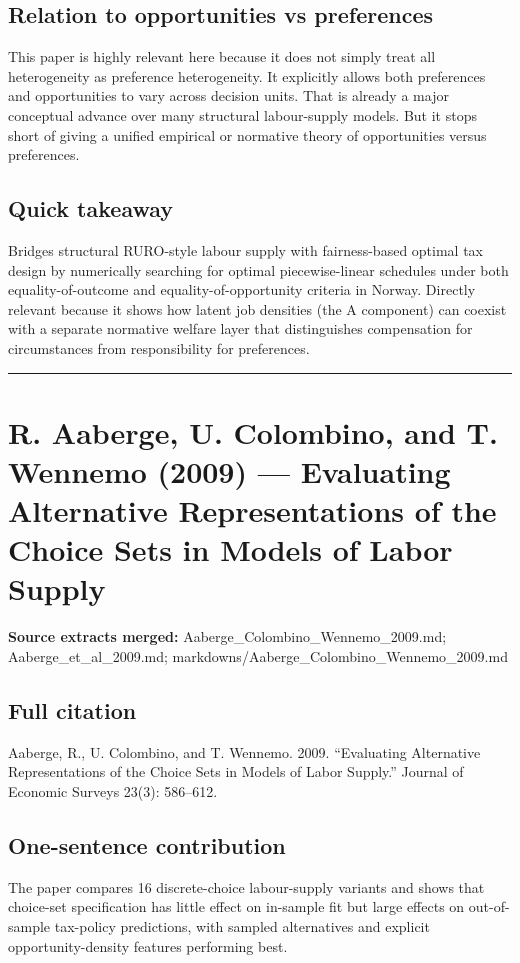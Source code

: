 \documentclass[11pt,a4paper]{article}
\begin{document}
\subsection*{Relation to opportunities vs preferences}
This paper is highly relevant here because it does not simply treat all heterogeneity as preference heterogeneity. It explicitly allows both preferences and opportunities to vary across decision units. That is already a major conceptual advance over many structural labour-supply models. But it stops short of giving a unified empirical or normative theory of opportunities versus preferences.

\subsection*{Quick takeaway}
Bridges structural RURO-style labour supply with fairness-based optimal tax design by numerically searching for optimal piecewise-linear schedules under both equality-of-outcome and equality-of-opportunity criteria in Norway. Directly relevant because it shows how latent job densities (the A component) can coexist with a separate normative welfare layer that distinguishes compensation for circumstances from responsibility for preferences.


\medskip\hrule\medskip

\section*{R. Aaberge, U. Colombino, and T. Wennemo (2009) — Evaluating Alternative Representations of the Choice Sets in Models of Labor Supply}

\textbf{Source extracts merged:} Aaberge\_Colombino\_Wennemo\_2009.md; Aaberge\_et\_al\_2009.md; markdowns/Aaberge\_Colombino\_Wennemo\_2009.md

\subsection*{Full citation}
Aaberge, R., U. Colombino, and T. Wennemo. 2009. “Evaluating Alternative Representations of the Choice Sets in Models of Labor Supply.” Journal of Economic Surveys 23(3): 586–612.

\subsection*{One-sentence contribution}
The paper compares 16 discrete-choice labour-supply variants and shows that choice-set specification has little effect on in-sample fit but large effects on out-of-sample tax-policy predictions, with sampled alternatives and explicit opportunity-density features performing best.
\end{document}

